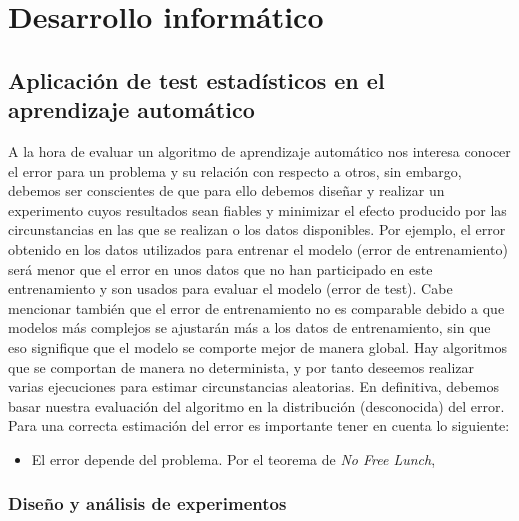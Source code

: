 %
%

\chapter{Desarrollo informático}

\section{Aplicación de test estadísticos en el aprendizaje automático}

	A la hora de evaluar un algoritmo de aprendizaje automático nos interesa conocer el error para un problema y su relación con respecto a otros, sin embargo, debemos ser conscientes de que para ello debemos diseñar y realizar un experimento cuyos resultados sean fiables y minimizar el efecto producido por las circunstancias en las que se realizan o los datos disponibles. Por ejemplo, el error obtenido en los datos utilizados para entrenar el modelo (error de entrenamiento) será menor que el error en unos datos que no han participado en este entrenamiento y son usados para evaluar el modelo (error de test). Cabe mencionar también que el error de entrenamiento no es comparable debido a que modelos más complejos se ajustarán más a los datos de entrenamiento, sin que eso signifique que el modelo se comporte mejor de manera global. Hay algoritmos que se comportan de manera no determinista, y por tanto deseemos realizar varias ejecuciones para estimar circunstancias aleatorias. En definitiva, debemos basar nuestra evaluación del algoritmo en la distribución (desconocida) del error. Para una correcta estimación del error es importante tener en cuenta lo siguiente:
	\begin{itemize}
	\item El error depende del problema. Por el teorema de \textit{No Free Lunch}, 
	\end{itemize}
	
	
\subsection{Diseño y análisis de experimentos}
	
%
